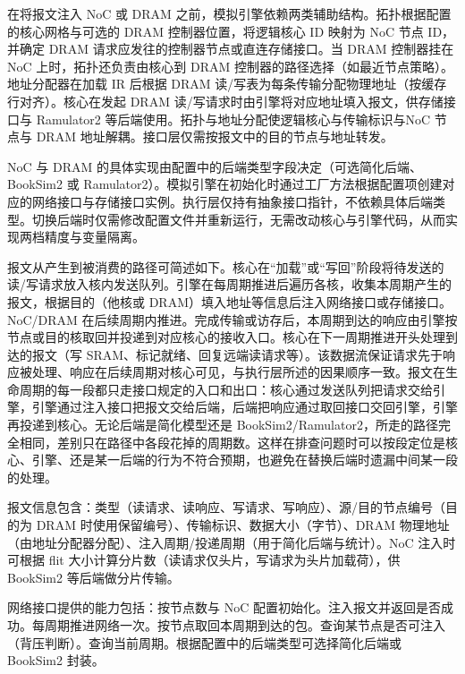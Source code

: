 在将报文注入 NoC 或 DRAM 之前，模拟引擎依赖两类辅助结构。拓扑根据配置的核心网格与可选的 DRAM 控制器位置，将逻辑核心 ID 映射为 NoC 节点 ID，并确定 DRAM 请求应发往的控制器节点或直连存储接口。当 DRAM 控制器挂在 NoC 上时，拓扑还负责由核心到 DRAM 控制器的路径选择（如最近节点策略）。地址分配器在加载 IR 后根据 DRAM 读/写表为每条传输分配物理地址（按缓存行对齐）。核心在发起 DRAM 读/写请求时由引擎将对应地址填入报文，供存储接口与 Ramulator2 等后端使用。拓扑与地址分配使逻辑核心与传输标识与NoC 节点与 DRAM 地址解耦。接口层仅需按报文中的目的节点与地址转发。


NoC 与 DRAM 的具体实现由配置中的后端类型字段决定（可选简化后端、BookSim2 或 Ramulator2）。模拟引擎在初始化时通过工厂方法根据配置项创建对应的网络接口与存储接口实例。执行层仅持有抽象接口指针，不依赖具体后端类型。切换后端时仅需修改配置文件并重新运行，无需改动核心与引擎代码，从而实现两档精度与变量隔离。

报文从产生到被消费的路径可简述如下。核心在“加载”或“写回”阶段将待发送的读/写请求放入核内发送队列。引擎在每周期推进后遍历各核，收集本周期产生的报文，根据目的（他核或 DRAM）填入地址等信息后注入网络接口或存储接口。NoC/DRAM 在后续周期内推进。完成传输或访存后，本周期到达的响应由引擎按节点或目的核取回并投递到对应核心的接收入口。核心在下一周期推进开头处理到达的报文（写 SRAM、标记就绪、回复远端读请求等）。该数据流保证请求先于响应被处理、响应在后续周期对核心可见，与执行层所述的因果顺序一致。报文在生命周期的每一段都只走接口规定的入口和出口：核心通过发送队列把请求交给引擎，引擎通过注入接口把报文交给后端，后端把响应通过取回接口交回引擎，引擎再投递到核心。无论后端是简化模型还是 BookSim2/Ramulator2，所走的路径完全相同，差别只在路径中各段花掉的周期数。这样在排查问题时可以按段定位是核心、引擎、还是某一后端的行为不符合预期，也避免在替换后端时遗漏中间某一段的处理。


报文信息包含：类型（读请求、读响应、写请求、写响应）、源/目的节点编号（目的为 DRAM 时使用保留编号）、传输标识、数据大小（字节）、DRAM 物理地址（由地址分配器分配）、注入周期/投递周期（用于简化后端与统计）。NoC 注入时可根据 flit 大小计算分片数（读请求仅头片，写请求为头片加载荷），供 BookSim2 等后端做分片传输。

网络接口提供的能力包括：按节点数与 NoC 配置初始化。注入报文并返回是否成功。每周期推进网络一次。按节点取回本周期到达的包。查询某节点是否可注入（背压判断）。查询当前周期。根据配置中的后端类型可选择简化后端或 BookSim2 封装。

